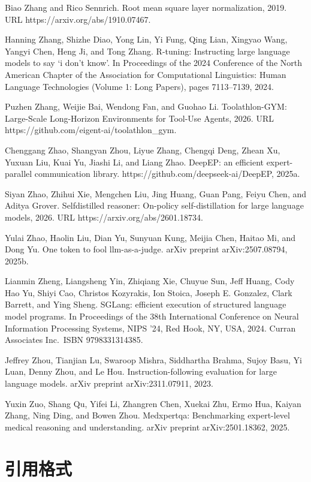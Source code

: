 \documentclass[
  10
]{article}
\begin{document}
Biao Zhang and Rico Sennrich. Root mean square layer normalization,
2019. URL https://arxiv.org/abs/1910.07467.

Hanning Zhang, Shizhe Diao, Yong Lin, Yi Fung, Qing Lian, Xingyao Wang,
Yangyi Chen, Heng Ji, and Tong Zhang. R-tuning: Instructing large
language models to say `i don't know'. In Proceedings of the 2024
Conference of the North American Chapter of the Association for
Computational Linguistics: Human Language Technologies (Volume 1: Long
Papers), pages 7113--7139, 2024.

Puzhen Zhang, Weijie Bai, Wendong Fan, and Guohao Li. Toolathlon-GYM:
Large-Scale Long-Horizon Environments for Tool-Use Agents, 2026. URL
https://github.com/eigent-ai/toolathlon\_gym.

Chenggang Zhao, Shangyan Zhou, Liyue Zhang, Chengqi Deng, Zhean Xu,
Yuxuan Liu, Kuai Yu, Jiashi Li, and Liang Zhao. DeepEP: an efficient
expert-parallel communication library. https://github.com/deepseek-ai/DeepEP, 2025a.

Siyan Zhao, Zhihui Xie, Mengchen Liu, Jing Huang, Guan Pang, Feiyu Chen,
and Aditya Grover. Selfdistilled reasoner: On-policy self-distillation
for large language models, 2026. URL https://arxiv.org/abs/2601.18734.

Yulai Zhao, Haolin Liu, Dian Yu, Sunyuan Kung, Meijia Chen, Haitao Mi,
and Dong Yu. One token to fool llm-as-a-judge. arXiv preprint
arXiv:2507.08794, 2025b.

Lianmin Zheng, Liangsheng Yin, Zhiqiang Xie, Chuyue Sun, Jeff Huang, Cody
Hao Yu, Shiyi Cao, Christos Kozyrakis, Ion Stoica, Joseph E. Gonzalez,
Clark Barrett, and Ying Sheng. SGLang: efficient execution of structured
language model programs. In Proceedings of the 38th International
Conference on Neural Information Processing Systems, NIPS '24, Red Hook,
NY, USA, 2024. Curran Associates Inc.~ISBN 9798331314385.

Jeffrey Zhou, Tianjian Lu, Swaroop Mishra, Siddhartha Brahma, Sujoy Basu,
Yi Luan, Denny Zhou, and Le Hou. Instruction-following evaluation for
large language models. arXiv preprint arXiv:2311.07911, 2023.

Yuxin Zuo, Shang Qu, Yifei Li, Zhangren Chen, Xuekai Zhu, Ermo Hua,
Kaiyan Zhang, Ning Ding, and Bowen Zhou. Medxpertqa: Benchmarking
expert-level medical reasoning and understanding. arXiv preprint
arXiv:2501.18362, 2025.

\section{引用格式}\label{a-citation-reference}
\end{document}
